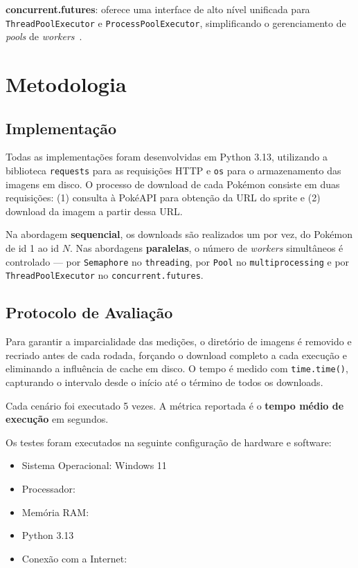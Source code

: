 \documentclass[12pt]{article}
\begin{document}
\textbf{concurrent.futures}: oferece uma interface de alto nível unificada para
\texttt{ThreadPoolExecutor} e \texttt{ProcessPoolExecutor}, simplificando o
gerenciamento de \textit{pools} de \textit{workers}~\cite{python-futures}.


\section{Metodologia}

\subsection{Implementação}

Todas as implementações foram desenvolvidas em Python 3.13, utilizando a biblioteca
\texttt{requests} para as requisições HTTP e \texttt{os} para o armazenamento das
imagens em disco. O processo de download de cada Pokémon consiste em duas
requisições: (1) consulta à PokéAPI para obtenção da URL do sprite e (2) download
da imagem a partir dessa URL.

Na abordagem \textbf{sequencial}, os downloads são realizados um por vez, do
Pokémon de id 1 ao id $N$. Nas abordagens \textbf{paralelas}, o número de
\textit{workers} simultâneos é controlado — por \texttt{Semaphore} no
\texttt{threading}, por \texttt{Pool} no \texttt{multiprocessing} e por
\texttt{ThreadPoolExecutor} no \texttt{concurrent.futures}.

\subsection{Protocolo de Avaliação}

Para garantir a imparcialidade das medições, o diretório de imagens é removido e
recriado antes de cada rodada, forçando o download completo a cada execução e
eliminando a influência de cache em disco. O tempo é medido com
\texttt{time.time()}, capturando o intervalo desde o início até o término de
todos os downloads.

Cada cenário foi executado 5 vezes. A métrica reportada é o \textbf{tempo médio
de execução} em segundos.

Os testes foram executados na seguinte configuração de hardware e software:

\begin{itemize}
  \item Sistema Operacional: Windows 11
  \item Processador: %
  \item Memória RAM: %
  \item Python 3.13
  \item Conexão com a Internet: %
\end{itemize}
\end{document}
